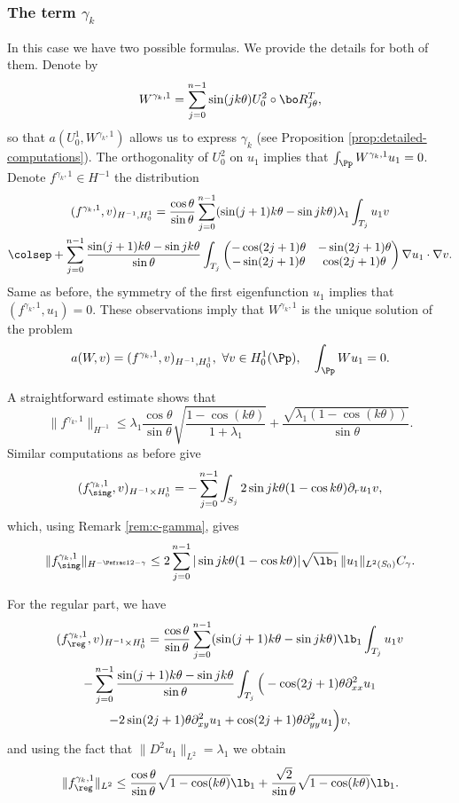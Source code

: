 \subsubsection*{The term $\gamma_k$} In this case we have two possible formulas. We provide the details for both of them. Denote by
\[
W^{\gamma_k,1} = \sum_{j=0}^{n-1} \sin(jk\theta) U_0^2\circ \bo R_{j\theta}^T,
\]
so that $a(U_0^1,W^{\gamma_k,1})$ allows us to express $\gamma_k$ (see Proposition \ref{prop:detailed-computations}). The orthogonality of $U_0^2$ on $u_1$ implies that $\int_\Pp W^{\gamma_k,1}u_1=0$. Denote $f^{\gamma_k,1} \in H^{-1}$ the distribution
\vspace*{-5pt}
\begin{multline*}
(f^{\gamma_k,1},v)_{H^{-1},H_0^1}
= \frac{\cos\theta}{\sin\theta}\sum_{j=0}^{n-1} (\sin(j+1)k\theta-\sin jk\theta) \lambda_1\int_{T_j} u_1 v\\\colsep
+ \sum_{j=0}^{n-1} \frac{\sin(j+1)k\theta-\sin jk\theta}{\sin \theta} \int_{T_j}\begin{pmatrix}
-\cos (2j+1)\theta & -\sin (2j+1) \theta \\
-\sin(2j+1)\theta & \cos (2j+1)\theta
\end{pmatrix}\nabla u_1 \cdot \nabla v.
\end{multline*}
Same as before, the symmetry of the first eigenfunction $u_1$ implies that $(f^{\gamma_k,1},u_1) = 0$. These observations imply that $W^{\gamma_k,1}$ is the unique solution of the problem
\[
a(W,v) = (f^{\gamma_k,1},v)_{H^{-1},H_0^1},\ \forall v \in H_0^1(\Pp),\quad \int_\Pp Wu_1=0.
\]

A straightforward estimate shows that
\[
\|f^{\gamma_k,1}\|_{H^{-1}} \leq \lambda_1\frac{\cos\theta}{\sin \theta} \sqrt{\frac{1-\cos(k\theta)}{1+\lambda_1}} +\frac{\sqrt{\lambda_1(1-\cos(k\theta))}}{\sin \theta}.
\]
Similar computations as before give
\[
(f_{\sing}^{\gamma_k,1}, v)_{H^{-1}\times H^1_0} = - \sum_{j=0}^{n-1}\int_{S_j} 2 \sin jk\theta(1-\cos k \theta) \partial_r u_1 v,
\]
which, using Remark \ref{rem:c-gamma}, gives
\[
\|f_{\sing}^{\gamma_k,1}\|_{H^{-\Psfrac 12-\gamma}}\le 2\sum_{j=0}^{n-1} | \sin jk\theta(1-\cos k \theta)| \sqrt{\lb_1}\,\|u_1\|_{L^2(S_0)} C_\gamma.
\]

For the regular part, we have
\vspace*{-5pt}
\begin{multline*}
(f_{\reg}^{\gamma_k,1}, v)_{H^{-1}\times H^1_0}= \frac{\cos \theta}{\sin \theta}\sum_{j=0}^{n-1} (\sin (j+1)k\theta-\sin jk\theta) \lb_1 \int_{T_j} u_1v \\
- \sum_{j=0}^{n-1} \frac{\sin(j+1)k\theta-\sin jk\theta}{\sin \theta} \int_{T_j} \Big (-\cos (2j+1)\theta \partial^2_{xx}u_1 \\
-2 \sin (2j+1)\theta \partial^2_{xy} u_1
+ \cos(2j+1)\theta \partial^2_{yy} u_1\Big)v,
\end{multline*}
and using the fact that $\|D^2 u_1\|_{L^2} = \lambda_1$ we obtain
\[
\|f_{\reg}^{\gamma_k,1}\|_{L^2}\le \frac{\cos\theta}{\sin \theta}\sqrt{1-\cos (k \theta)} \lb_1 +\frac{\sqrt{2}}{\sin \theta} \sqrt{1- \cos (k \theta)}\lb_1 .
\]

